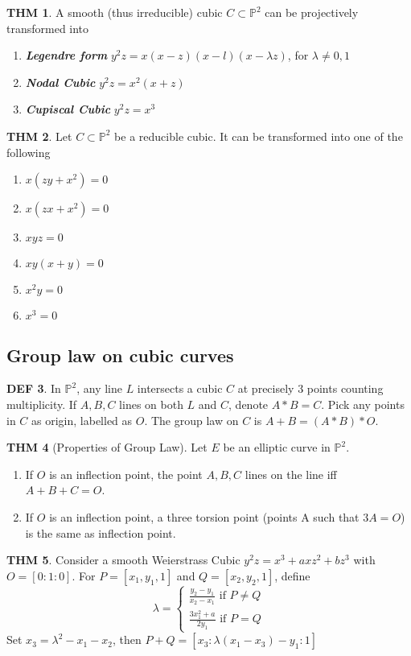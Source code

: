 \documentclass[twocolumn]{article}
\renewcommand{\emph}[1]{\textbf{\textit{#1}}}
\renewcommand{\P}{\mathbb{P}}
\theoremstyle{definition}
\newtheorem{thm}{THM}
\newtheorem{defi}[thm]{DEF}
\theoremstyle{remark}
\begin{document}
\begin{thm}	A smooth (thus irreducible) cubic $C \subset \P^2$ can be projectively transformed into 
	\begin{enumerate}
		\item \emph{Legendre form} $y^2z = x(x-z)(x-l)(x-\lambda z)$, for $\lambda \neq 0, 1$
		\item \emph{Nodal Cubic }$y^2z = x^2(x+z)$
		\item \emph{Cupiscal Cubic }$y^2z = x^3$
	\end{enumerate}
\end{thm}

\begin{thm}
	Let $C \subset \P^2$ be a reducible cubic. It can be transformed into one of the following
	\begin{enumerate}
		\item $x(zy + x^2) = 0$
		\item $x(zx + x^2) = 0$
		\item $xyz = 0$
		\item $xy(x+y) = 0$
		\item $x^2y = 0$
		\item $x^3 = 0$
	\end{enumerate}
\end{thm}

\subsection{Group law on cubic curves}
\begin{defi}
	In $\P^2$, any line $L$ intersects a cubic $C$ at precisely $3$ points counting multiplicity. 
	If $A, B, C$ lines on both $L$ and $C$, denote $A*B = C$. 
	Pick any points in $C$ as origin, labelled as $O$. The group law on $C$ is $A+B = (A*B)*O$.
\end{defi}

\begin{thm}[Properties of Group Law]
	Let $E$ be an elliptic curve in $\P^2$.
	\begin{enumerate}
		\item If $O$ is an inflection point, the point $A,B, C$ lines on the line iff $A + B + C = O$.
		\item If $O$ is an inflection point, a three torsion point (points A such that $3A = O$) is the same as inflection point.
	\end{enumerate}
\end{thm}

\begin{thm}
	Consider a smooth Weierstrass Cubic $y^2z = x^3 + axz^2 + bz^3$ with $O = [0:1:0]$. 
	For  $P = [x_1, y_1, 1]$ and $Q = [x_2, y_2, 1]$, define 
	$$\lambda = \begin{cases}
		\frac{y_2 - y_1}{x_2 - x_1} \text{ if } P \neq Q \\ 
		\frac{3x_1^2 + a}{2y_1} \text{ if } P=Q
	\end{cases} 
	$$
	Set $x_3 = \lambda^2 - x_1-x_2$, then $P+Q = [x_3: \lambda(x_1 - x_3) - y_1:1]$
\end{thm}
\end{document}
